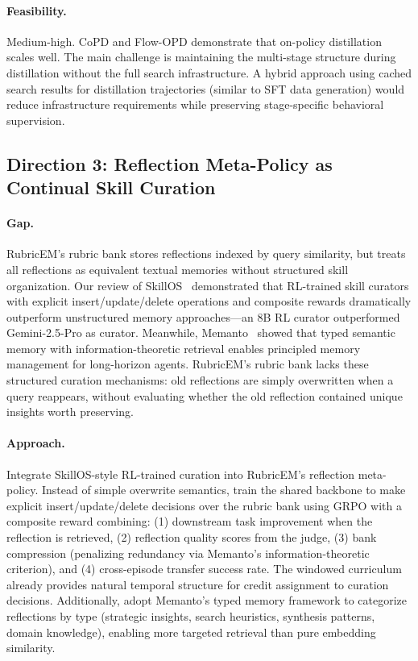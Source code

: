 \documentclass[11pt,a4paper]{article}
\begin{document}
\paragraph{Feasibility.} Medium-high. CoPD and Flow-OPD demonstrate that on-policy distillation scales well. The main challenge is maintaining the multi-stage structure during distillation without the full search infrastructure. A hybrid approach using cached search results for distillation trajectories (similar to SFT data generation) would reduce infrastructure requirements while preserving stage-specific behavioral supervision.

\subsection{Direction 3: Reflection Meta-Policy as Continual Skill Curation}

\paragraph{Gap.} RubricEM's rubric bank stores reflections indexed by query similarity, but treats all reflections as equivalent textual memories without structured skill organization. Our review of SkillOS~\cite{skillos} demonstrated that RL-trained skill curators with explicit insert/update/delete operations and composite rewards dramatically outperform unstructured memory approaches---an 8B RL curator outperformed Gemini-2.5-Pro as curator. Meanwhile, Memanto~\cite{memanto} showed that typed semantic memory with information-theoretic retrieval enables principled memory management for long-horizon agents. RubricEM's rubric bank lacks these structured curation mechanisms: old reflections are simply overwritten when a query reappears, without evaluating whether the old reflection contained unique insights worth preserving.

\paragraph{Approach.} Integrate SkillOS-style RL-trained curation into RubricEM's reflection meta-policy. Instead of simple overwrite semantics, train the shared backbone to make explicit insert/update/delete decisions over the rubric bank using GRPO with a composite reward combining: (1) downstream task improvement when the reflection is retrieved, (2) reflection quality scores from the judge, (3) bank compression (penalizing redundancy via Memanto's information-theoretic criterion), and (4) cross-episode transfer success rate. The windowed curriculum already provides natural temporal structure for credit assignment to curation decisions. Additionally, adopt Memanto's typed memory framework to categorize reflections by type (strategic insights, search heuristics, synthesis patterns, domain knowledge), enabling more targeted retrieval than pure embedding similarity.
\end{document}
